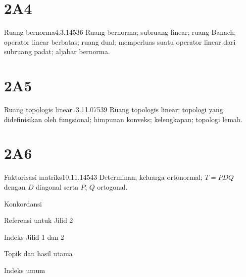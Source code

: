 \section{2A4}{Ruang bernorma}{4.3.14}{536}{}
{Ruang bernorma; subruang linear; ruang Banach;
operator linear berbatas; ruang dual; memperluas suatu operator linear
dari subruang padat; aljabar bernorma.}

\section{2A5}{Ruang topologis linear}{13.11.07}{539}{}
{Ruang topologis linear; topologi yang didefinisikan oleh fungsional;
himpunan konveks; kelengkapan; topologi lemah.}

\section{2A6}{Faktorisasi matriks}{10.11.14}{543}{}
{Determinan; keluarga ortonormal; $T=PDQ$ dengan $D$
diagonal serta $P$, $Q$ ortogonal.}


Konkordansi 

\medskip

Referensi untuk Jilid 2 

\medskip

Indeks Jilid 1 dan 2

\qquad Topik dan hasil utama 

\qquad Indeks umum 

